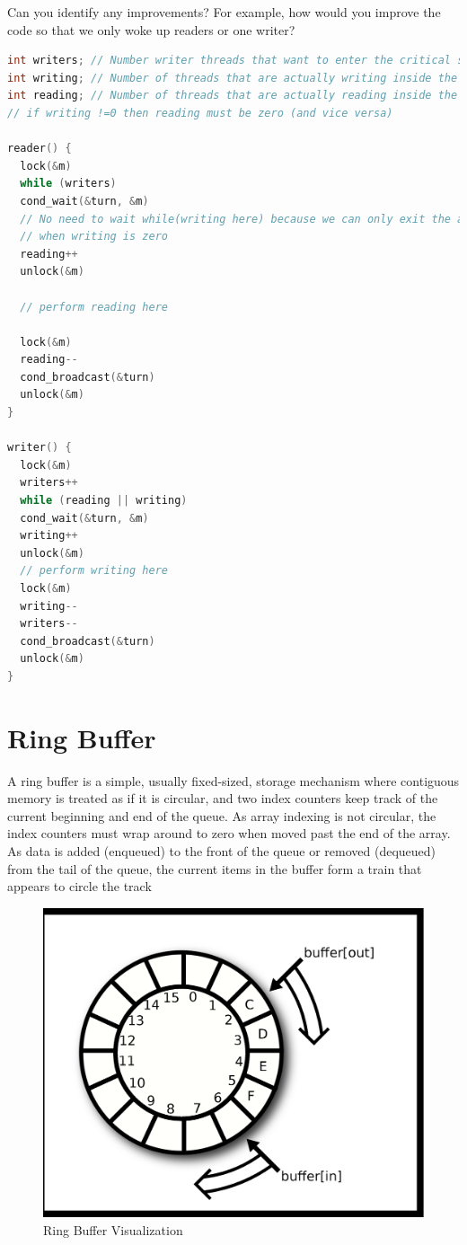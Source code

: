 Can you identify any improvements?
For example, how would you improve the code so that we only woke up readers or one writer?

\begin{lstlisting}[language=C]
int writers; // Number writer threads that want to enter the critical section (some or all of these may be blocked)
int writing; // Number of threads that are actually writing inside the C.S. (can only be zero or one)
int reading; // Number of threads that are actually reading inside the C.S.
// if writing !=0 then reading must be zero (and vice versa)

reader() {
  lock(&m)
  while (writers)
  cond_wait(&turn, &m)
  // No need to wait while(writing here) because we can only exit the above loop
  // when writing is zero
  reading++
  unlock(&m)

  // perform reading here

  lock(&m)
  reading--
  cond_broadcast(&turn)
  unlock(&m)
}

writer() {
  lock(&m)
  writers++
  while (reading || writing)
  cond_wait(&turn, &m)
  writing++
  unlock(&m)
  // perform writing here
  lock(&m)
  writing--
  writers--
  cond_broadcast(&turn)
  unlock(&m)
}
\end{lstlisting}

\section{Ring Buffer}

A ring buffer is a simple, usually fixed-sized, storage mechanism where contiguous memory is treated as if it is circular, and two index counters keep track of the current beginning and end of the queue.
As array indexing is not circular, the index counters must wrap around to zero when moved past the end of the array.
As data is added (enqueued) to the front of the queue or removed (dequeued) from the tail of the queue, the current items in the buffer form a train that appears to circle the track

\begin{figure}
\centering
\includegraphics[width=.5\textwidth]{synchronization/drawings/ring_buffer.eps}
\caption{Ring Buffer Visualization}
\end{figure}

